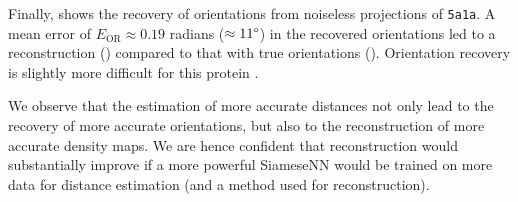 Finally,  shows the recovery of orientations from noiseless projections of \texttt{5a1a}.
A mean error of $E_\text{OR} \approx 0.19$ radians ($\approx 11\degree$) in the recovered orientations led to a  reconstruction () compared to that with true orientations ().
Orientation recovery is slightly more difficult for this protein  .

We observe that the estimation of more accurate distances not only lead to the recovery of more accurate orientations, but also to the reconstruction of more accurate density maps.
We are hence confident that reconstruction would substantially improve if a more powerful SiameseNN would be trained on more data for distance estimation (and a   method used for reconstruction).
